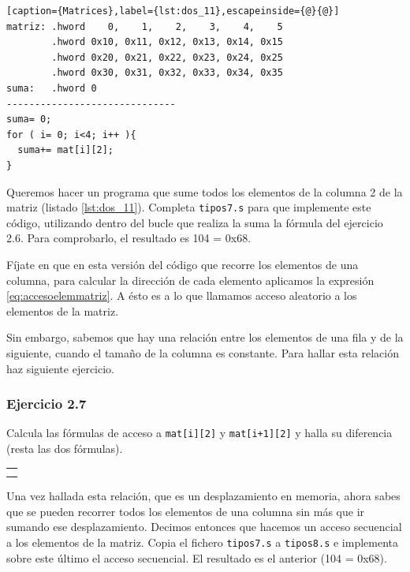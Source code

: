 \begin{lstlisting}[caption={Matrices},label={lst:dos_11},escapeinside={@}{@}]
matriz: .hword    0,    1,    2,    3,    4,    5
        .hword 0x10, 0x11, 0x12, 0x13, 0x14, 0x15
        .hword 0x20, 0x21, 0x22, 0x23, 0x24, 0x25
        .hword 0x30, 0x31, 0x32, 0x33, 0x34, 0x35
suma:   .hword 0
------------------------------
suma= 0; 
for ( i= 0; i<4; i++ ){
  suma+= mat[i][2];
}
\end{lstlisting}

Queremos hacer un programa que sume todos los elementos de la columna
2 de la matriz (listado \ref{lst:dos_11}). Completa {\tt tipos7.s} para
que implemente este código, utilizando dentro del bucle que realiza la
suma la fórmula del ejercicio 2.6. Para comprobarlo, el resultado
es 104 = 0x68.

Fíjate en que en esta versión del código que recorre los elementos de
una columna,  para calcular la dirección de cada elemento aplicamos la
expresión \ref{eq:accesoelemmatriz}. A ésto es a lo que llamamos
acceso aleatorio a los elementos de la matriz. 

Sin embargo, sabemos que hay una relación entre los elementos de una
fila y de la siguiente, cuando el tamaño de la columna es
constante. Para hallar esta relación haz siguiente ejercicio.

\subsubsection{Ejercicio 2.7}

Calcula las fórmulas de acceso a  {\tt mat[i][2]} y  {\tt mat[i+1][2]} y
halla su diferencia (resta las dos fórmulas).

\vspace{0.25cm}
\colorbox[gray]{0.9}{
\small
\begin{tabular}{c}
\\
\begin{minipage}{0.9\linewidth}
\colorbox[gray]{1}{\rule{0cm}{0.6cm}\rule{11cm}{0cm}}\\
\end{minipage} \\
\end{tabular}
\vspace{0.5ex}
}

\vspace{0.25cm} 

Una vez hallada esta relación, que es un desplazamiento en memoria,
ahora sabes que se pueden recorrer todos los elementos de una columna
sin más que ir sumando ese desplazamiento. Decimos entonces que
hacemos un acceso secuencial a los elementos de la matriz. Copia el
fichero {\tt tipos7.s} a {\tt tipos8.s} e implementa sobre este
último  el acceso secuencial. El resultado es el anterior (104 = 0x68).

\chapterend{}
